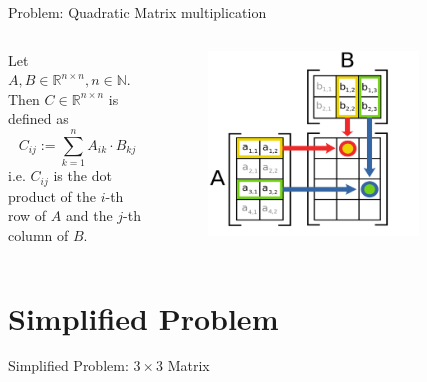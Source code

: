\documentclass[compress,aspectratio=169]{beamer}
\begin{document}
\begin{frame}{Problem: Quadratic Matrix multiplication}
  \begin{columns}
    \begin{column}{0.5\textwidth}
      Let $A, B \in \mathbb{R}^{n\times n}, n \in \mathbb{N}$. Then $C \in \mathbb{R}^{n \times n}$ is defined as
      \[
        C_{ij} := \sum_{k=1}^n A_{ik} \cdot B_{kj}
      \]
      i.e. $C_{ij}$ is the dot product of the $i$-th row of $A$ and the $j$-th column of $B$.
    \end{column}
    \begin{column}{0.5\textwidth}
      \begin{figure}
        \includegraphics[width=0.8\textwidth]{../assets/Matrix_multiplication_diagram_2.svg.png} \cite{matmulvis}
      \end{figure}
    \end{column}
  \end{columns}
\end{frame}

\section{Simplified Problem}

\begin{frame}[fragile]{Simplified Problem: $3 \times 3$ Matrix}
  \begin{tcolorbox}[title=First Implementation]
    \footnotesize\inputminted[xleftmargin=1em,linenos]{rust}{../assets/first_impl.rs}
  \end{tcolorbox}
\end{frame}
\end{document}
